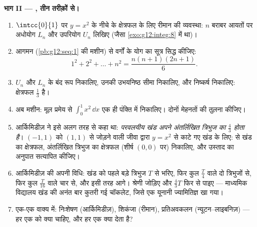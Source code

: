 \begin{problem}
\medskip
\noindent\textbf{भाग II --- , तीन तरीक़ों से।}
\begin{enumerate}[resume]
  \item $\intcc{0}{1}$ पर $y = x^2$ के नीचे के क्षेत्रफल के लिए रीमान की व्यवस्था: $n$
        बराबर आयतों पर अधोयोग $L_n$ और उपरियोग $U_n$ लिखिए (जैसा \cref{exo:g12:integ:8} में
        था)।
  \item आगमन (\cref{pb:g12:seq:1} की मशीन) से वर्गों के योग का सूत्र सिद्ध कीजिए:
        \[
        1^2 + 2^2 + \dots + n^2 = \frac{n(n+1)(2n+1)}{6} .
        \]
  \item $U_n$ और $L_n$ के बंद रूप निकालिए, उनकी उभयनिष्ठ सीमा निकालिए, और
        निष्कर्ष निकालिए: क्षेत्रफल $\frac13$ है।
  \item अब मशीन: मूल प्रमेय से $\int_0^1 x^2\,\dd x$ एक ही पंक्ति में निकालिए। दोनों मेहनतों
        की तुलना कीजिए।
  \item आर्किमिडीज़ ने इसे अलग तरह से कहा था: \emph{परवलयीय खंड अपने अंतर्लिखित
        त्रिभुज का $\frac43$ होता है}। $(-1, 1)$ को $(1, 1)$ से जोड़ने वाली जीवा द्वारा
        $y = x^2$ से काटे गए खंड के लिए:  से खंड का क्षेत्रफल, अंतर्लिखित
        त्रिभुज का क्षेत्रफल (शीर्ष $(0, 0)$ पर) निकालिए, और उस्ताद का अनुपात
        सत्यापित कीजिए।
  \item आर्किमिडीज़ की अपनी विधि: खंड को पहले बड़े त्रिभुज $T$ से भरिए,
        फिर कुल $\frac T4$ वाले दो त्रिभुजों से, फिर कुल $\frac{T}{16}$ वाले चार से, और
        इसी तरह आगे।  श्रेणी जोड़िए और $\frac43 T$ फिर से पाइए ---
        माध्यमिक विद्यालय खंड की अनंत बार कुतरी गई चॉकलेट, जिसे एक यूनानी
        ज्यामितिज्ञ खा गया।
  \item एक-एक वाक्य में: निःशेषण (आर्किमिडीज़), शिकंजा (रीमान), प्रतिअवकलन
        (न्यूटन--लाइबनिज़) --- हर एक को क्या चाहिए, और हर एक क्या देता है?
\end{enumerate}


\end{problem}
